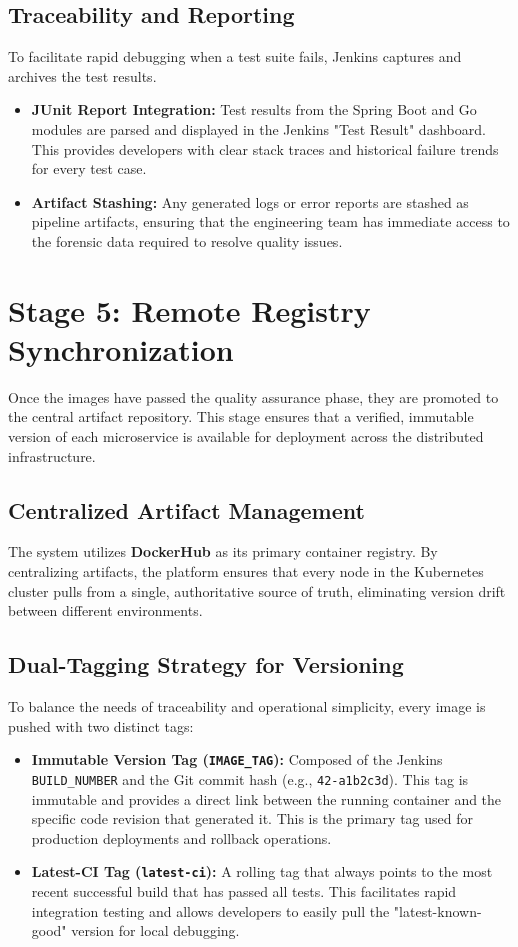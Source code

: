 \documentclass[12pt,a4paper]{report}
\begin{document}
\subsection{Traceability and Reporting}
To facilitate rapid debugging when a test suite fails, Jenkins captures and archives the test results.
\begin{itemize}
    \item \textbf{JUnit Report Integration:} Test results from the Spring Boot and Go modules are parsed and displayed in the Jenkins "Test Result" dashboard. This provides developers with clear stack traces and historical failure trends for every test case.
    \item \textbf{Artifact Stashing:} Any generated logs or error reports are stashed as pipeline artifacts, ensuring that the engineering team has immediate access to the forensic data required to resolve quality issues.
\end{itemize}

\section{Stage 5: Remote Registry Synchronization}
Once the images have passed the quality assurance phase, they are promoted to the central artifact repository. This stage ensures that a verified, immutable version of each microservice is available for deployment across the distributed infrastructure.

\subsection{Centralized Artifact Management}
The system utilizes \textbf{DockerHub} as its primary container registry. By centralizing artifacts, the platform ensures that every node in the Kubernetes cluster pulls from a single, authoritative source of truth, eliminating version drift between different environments.

\subsection{Dual-Tagging Strategy for Versioning}
To balance the needs of traceability and operational simplicity, every image is pushed with two distinct tags:
\begin{itemize}
    \item \textbf{Immutable Version Tag (\texttt{IMAGE\_TAG}):} Composed of the Jenkins \texttt{BUILD\_NUMBER} and the Git commit hash (e.g., \texttt{42-a1b2c3d}). This tag is immutable and provides a direct link between the running container and the specific code revision that generated it. This is the primary tag used for production deployments and rollback operations.
    \item \textbf{Latest-CI Tag (\texttt{latest-ci}):} A rolling tag that always points to the most recent successful build that has passed all tests. This facilitates rapid integration testing and allows developers to easily pull the "latest-known-good" version for local debugging.
\end{itemize}
\end{document}
